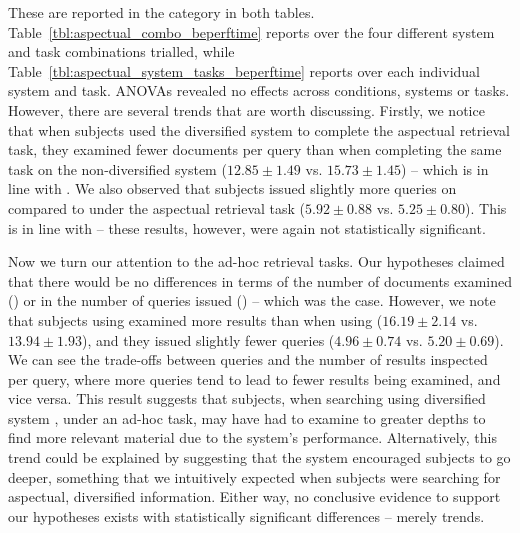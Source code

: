 \vspace*{-3mm}
These are reported in the  category in both tables. Table~\ref{tbl:aspectual_combo_beperftime} reports over the four different system and task combinations trialled, while Table~\ref{tbl:aspectual_system_tasks_beperftime} reports over each individual system and task. ANOVAs revealed no effects across conditions, systems or tasks. However, there are several trends that are worth discussing. Firstly, we notice that when subjects used the diversified system  to complete the aspectual retrieval task, they examined fewer documents per query than when completing the same task on the non-diversified system  ($12.85\pm1.49$ vs. $15.73\pm1.45$) -- which is in line with . We also observed that subjects issued slightly more queries on  compared to  under the aspectual retrieval task ($5.92\pm0.88$ vs. $5.25\pm0.80$). This is in line with  -- these results, however, were again not statistically significant.

\vspace*{-1mm}
Now we turn our attention to the ad-hoc retrieval tasks. Our hypotheses claimed that there would be no differences in terms of the number of documents examined () or in the number of queries issued () -- which was the case. However, we note that subjects using  examined more results than when using  ($16.19\pm2.14$ vs. $13.94\pm1.93$), and they issued slightly fewer queries ($4.96\pm0.74$ vs. $5.20\pm0.69$). We can see the trade-offs between queries and the number of results inspected per query, where more queries tend to lead to fewer results being examined, and vice versa. This result suggests that subjects, when searching using diversified system , under an ad-hoc task, may have had to examine to greater depths to find more relevant material due to the system's performance. Alternatively, this trend could be explained by suggesting that the system encouraged subjects to go deeper, something that we intuitively expected when subjects were searching for aspectual, diversified information. Either way, no conclusive evidence to support our hypotheses exists with statistically significant differences -- merely trends.

